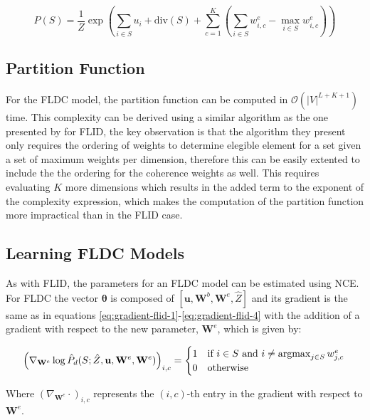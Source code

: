 \begin{equation}
  \tag{FLDC}
  P(S) = \frac{1}{Z}\exp{\left(\sum_{i \in S}{u_{i}} + \mathrm{div}(S) + \sum_{c=1}^{K}{\left(\sum_{i \in S}{w^{e}_{i,c}} - \max_{i \in S}{w^{e}_{i,c}}\right)}\right)}
  \label{eq:fldc}
\end{equation}

\subsection{Partition Function}

For the FLDC model, the partition function can be computed in $\mathcal{O}(|V|^{L+K+1})$ time. This complexity can be derived using a similar algorithm as the one presented by \citet{tschiatschek16learning} for FLID, the key observation is that the algorithm they present only requires the ordering of weights to determine elegible element for a set given a set of maximum weights per dimension, therefore this can be easily extented to include the the ordering for the coherence weights as well. This requires evaluating $K$ more dimensions which results in the added term to the exponent of the complexity expression, which makes the computation of the partition function more impractical than in the FLID case.

\subsection{Learning FLDC Models}

As with FLID, the parameters for an FLDC model can be estimated using NCE. For FLDC the vector $\boldsymbol{\theta}$ is composed of $[\mathbf{u}, \mathbf{W}^{b}, \mathbf{W}^{e}, \hat{Z}]$ and its gradient is the same as in equations \eqref{eq:gradient-flid-1}-\eqref{eq:gradient-flid-4} with the addition of a gradient with respect to the new parameter, $\mathbf{W}^{e}$, which is given by:

\begin{equation}
\left(\nabla_{\mathbf{W}^{e}}\log{\hat{P}_{d}(S; \hat{Z}, \mathbf{u}, \mathbf{W}^{e}, \mathbf{W}^{e})}\right)_{i,c} = \begin{cases}
1 & \text{if}\ i \in S\ \text{and}\ i \neq \operatorname*{argmax}_{j \in S}{w^{e}_{j,c}} \\
0 & \text{otherwise}
\end{cases} \label{eq:sub-fldc}\\
\end{equation}

Where $\left(\nabla_{\mathbf{W}^{e}}\cdot \right)_{i,c}$ represents the $(i,c)$-th entry in the gradient with respect to $\mathbf{W}^{e}$.

